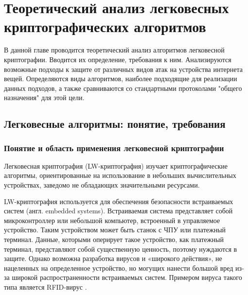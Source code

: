 \chapter{Теоретический анализ легковесных криптографических алгоритмов} \label{ch2}
	

В данной главе проводится теоретический анализ алгоритмов легковесной криптографии. Вводится их определение, требования к ним. Анализируются возможные подходы к защите от различных видов атак на устройства интернета вещей. Определяются виды алгоритмов, наиболее подходящие для реализации данных подходов, а также сравниваются со стандартными протоколами "общего назначения" для этой цели.

\section{Легковесные алгоритмы: понятие, требования} \label{ch2:sec1}

\subsection{Понятие и область применения легковесной криптографии} %

Легковесная криптография (LW-криптография) изучает криптографические алгоритмы, ориентированные на использование в небольших вычислительных устройствах, заведомо не обладающих значительными ресурсами.

LW-криптография используется для обеспечения безопасности встраиваемых систем (англ. embedded systems). Встраиваемая система представляет собой микроконтроллер или небольшой компьютер, встроенный в управляемое устройство. Таким устройством может быть станок с ЧПУ или платежный терминал. Данные, которыми оперирует такое устройство, как платежный терминал, представляют собой существенную ценность, поэтому нуждаются в защите. Однако возможна разработка вирусов и «широкого действия», не нацеленных на определенное устройство, но могущих нанести большой вред из-за широкой распространенности встраиваемых систем. Примером вируса такого типа является RFID-вирус \cite{src22}.

